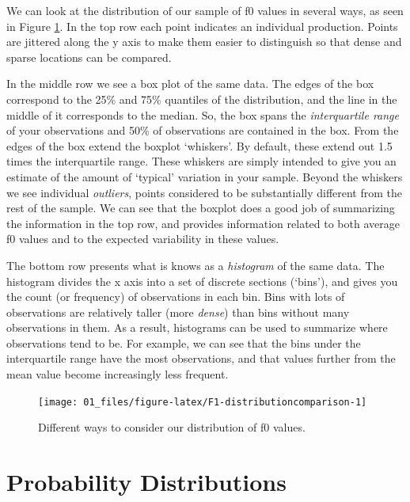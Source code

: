 \documentclass[
]{book}
\begin{document}
We can look at the distribution of our sample of f0 values in several ways, as seen in Figure \ref{fig:F1-distributioncomparison}. In the top row each point indicates an individual production. Points are jittered along the y axis to make them easier to distinguish so that dense and sparse locations can be compared.

In the middle row we see a box plot of the same data. The edges of the box correspond to the 25\% and 75\% quantiles of the distribution, and the line in the middle of it corresponds to the median. So, the box spans the \emph{interquartile range} of your observations and 50\% of observations are contained in the box. From the edges of the box extend the boxplot `whiskers'. By default, these extend out 1.5 times the interquartile range. These whiskers are simply intended to give you an estimate of the amount of `typical' variation in your sample. Beyond the whiskers we see individual \emph{outliers}, points considered to be substantially different from the rest of the sample. We can see that the boxplot does a good job of summarizing the information in the top row, and provides information related to both average f0 values and to the expected variability in these values.

The bottom row presents what is knows as a \emph{histogram} of the same data. The histogram divides the x axis into a set of discrete sections (`bins'), and gives you the count (or frequency) of observations in each bin. Bins with lots of observations are relatively taller (more \emph{dense}) than bins without many observations in them. As a result, histograms can be used to summarize where observations tend to be. For example, we can see that the bins under the interquartile range have the most observations, and that values further from the mean value become increasingly less frequent.

\begin{figure}

{\centering \texttt{[image: 01\_files/figure-latex/F1-distributioncomparison-1]} 

}

\caption{Different ways to consider our distribution of f0 values.}\label{fig:F1-distributioncomparison}
\end{figure}

\hypertarget{probability-distributions}{%
\section{Probability Distributions}\label{probability-distributions}}
\end{document}
